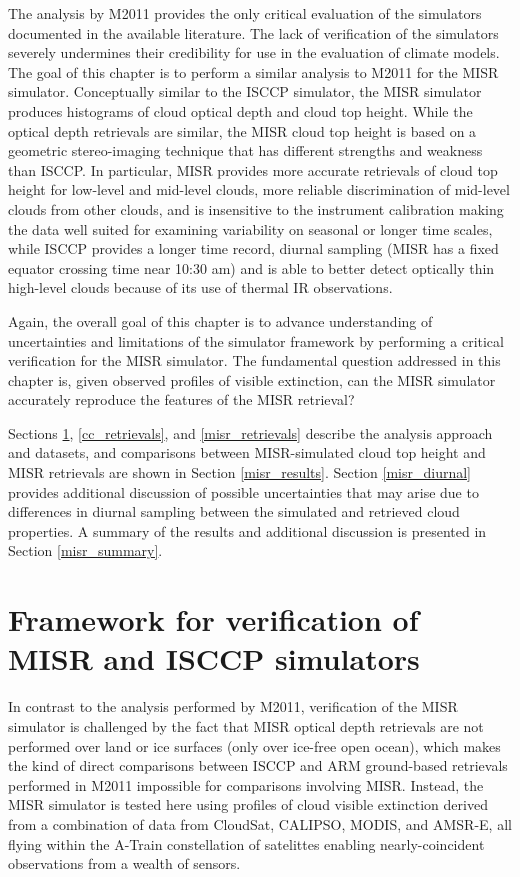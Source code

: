 The analysis by M2011 provides the only critical evaluation of the simulators documented in the available literature. The lack of verification of the simulators severely undermines their credibility for use in the evaluation of climate models. The goal of this chapter is to perform a similar analysis to M2011 for the MISR simulator. Conceptually similar to the ISCCP simulator, the MISR simulator produces histograms of cloud optical depth and cloud top height. While the optical depth retrievals are similar, the MISR cloud top height is based on a geometric stereo-imaging technique that has different strengths and weakness than ISCCP. In particular, MISR provides more accurate retrievals of cloud top height for low-level and mid-level clouds, more reliable discrimination of mid-level clouds from other clouds, and is insensitive to the instrument calibration making the data well suited for examining variability on seasonal or longer time scales, while ISCCP provides a longer time record, diurnal sampling (MISR has a fixed equator crossing time near 10:30 am) and is able to better detect optically thin high-level clouds because of its use of thermal IR observations.

Again, the overall goal of this chapter is to advance understanding of uncertainties and limitations of the simulator framework by performing a critical verification for the MISR simulator. The fundamental question addressed in this chapter is, given observed profiles of visible extinction, can the MISR simulator accurately reproduce the features of the MISR retrieval?

Sections \ref{misr_framework}, \ref{cc_retrievals}, and \ref{misr_retrievals} describe the analysis approach and datasets, and comparisons between MISR-simulated cloud top height and MISR retrievals are shown in Section \ref{misr_results}. Section \ref{misr_diurnal} provides additional discussion of possible uncertainties that may arise due to differences in diurnal sampling between the simulated and retrieved cloud properties. A summary of the results and additional discussion is presented in Section \ref{misr_summary}. 


\section{Framework for verification of MISR and ISCCP simulators}
\label{misr_framework}
In contrast to the analysis performed by M2011, verification of the MISR simulator is challenged by the fact that MISR optical depth retrievals are not performed over land or ice surfaces (only over ice-free open ocean), which makes the kind of direct comparisons between ISCCP and ARM ground-based retrievals performed in M2011 impossible for comparisons involving MISR. Instead, the MISR simulator is tested here using profiles of cloud visible extinction derived from a combination of data from CloudSat, CALIPSO, MODIS, and AMSR-E, all flying within the A-Train constellation of satelittes enabling nearly-coincident observations from a wealth of sensors.

